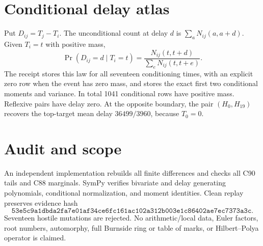 \documentclass[10pt]{article}
\begin{document}
\section{Conditional delay atlas}
Put $D_{ij}=T_j-T_i$.  The unconditional count at delay $d$ is
$\sum_aN_{ij}(a,a+d)$.  Given $T_i=t$ with positive mass,
\[
 \Pr(D_{ij}=d\mid T_i=t)
 =\frac{N_{ij}(t,t+d)}{\sum_eN_{ij}(t,t+e)}.
\]
The receipt stores this law for all seventeen conditioning times, with an
explicit zero row when the event has zero mass, and stores the exact first
two conditional moments and variance.  In total 1041 conditional rows have
positive mass.  Reflexive pairs have delay zero.  At the opposite boundary,
the pair $(H_0,H_{19})$ recovers the top-target mean delay
$36499/3960$, because $T_0=0$.

\section{Audit and scope}
An independent implementation rebuilds all finite differences and checks all
C90 tails and C88 marginals.  SymPy verifies bivariate and delay generating
polynomials, conditional normalization, and moment identities.  Clean replay
preserves evidence hash
\[
\texttt{53e5c9a1dbda2fa7e01af34ce6fc161ac102a312b003e1c86402ae7ec7373a3c}.
\]
Seventeen hostile mutations are rejected.  No arithmetic/local data, Euler
factors, root numbers, automorphy, full Burnside ring or table of marks, or
Hilbert--Polya operator is claimed.
\end{document}
